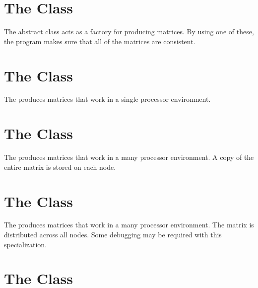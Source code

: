 

\section{The  Class}
\label{SCMatrixKit}

The  abstract class acts as a factory for producing
matrices.  By using one of these, the program makes sure that all of the
matrices are consistent.


\section{The  Class}
\label{LocalSCMatrixKit}

The  produces matrices that work in a
single processor environment.


\section{The  Class}
\label{ReplSCMatrixKit}

The  produces matrices that work in a
many processor environment.  A copy of the entire matrix is stored
on each node.


\section{The  Class}
\label{DistSCMatrixKit}

The  produces matrices that work in a many processor
environment.  The matrix is distributed across all nodes.  Some debugging
may be required with this specialization.


\section{The  Class}
\label{SCDimension}

